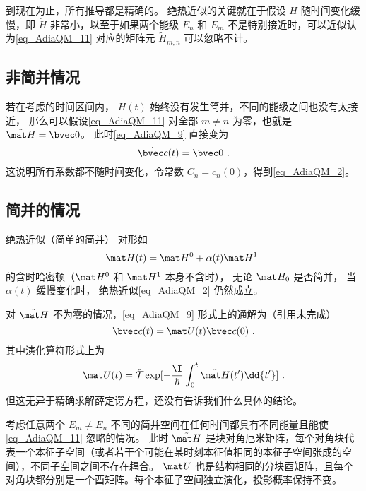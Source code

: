 到现在为止，所有推导都是精确的。 绝热近似的关键就在于假设 $H$ 随时间变化缓慢，即 $\dot H$ 非常小，以至于如果两个能级 $E_n$ 和 $E_m$ 不是特别接近时，可以近似认为\autoref{eq_AdiaQM_11} 对应的矩阵元 $\tilde H_{m,n}$ 可以忽略不计。

\subsection{非简并情况}
若在考虑的时间区间内， $H(t)$ 始终没有发生简并，不同的能级之间也没有太接近， 那么可以假设\autoref{eq_AdiaQM_11} 对全部 $m\ne n$ 为零，也就是 $\tilde{\mat H} = \bvec 0$。 此时\autoref{eq_AdiaQM_9} 直接变为
\begin{equation}
\dot{\bvec c}(t) = \bvec 0~.
\end{equation}
这说明所有系数都不随时间变化，令常数 $C_n = c_n(0)$，得到\autoref{eq_AdiaQM_2}。

\subsection{简并的情况}\label{sub_AdiaQM_1}
\begin{theorem}{绝热近似（简单的简并）}
对形如
\begin{equation}\label{eq_AdiaQM_15}
\mat H(t) = \mat H^0 + \alpha(t)\mat H^1~
\end{equation}
的含时哈密顿（$\mat H^0$ 和 $\mat H^1$ 本身不含时）， 无论 $\mat H_0$ 是否简并， 当 $\alpha(t)$ 缓慢变化时， 绝热近似\autoref{eq_AdiaQM_2} 仍然成立。
\end{theorem}

对 $\tilde{\mat H}$ 不为零的情况，\autoref{eq_AdiaQM_9} 形式上的通解为（引用未完成）
\begin{equation}
\bvec c(t) = \mat U(t)\bvec c(0)~.
\end{equation}
其中演化算符形式上为
\begin{equation}
\mat U(t) = \hat{\mathcal{T}}\exp[-\frac{\I}{\hbar}\int_0^t \tilde{\mat H}(t') \dd{t'}]~.
\end{equation}
但这无异于精确求解薛定谔方程，还没有告诉我们什么具体的结论。

考虑任意两个 $E_m\ne E_n$ 不同的简并空间在任何时间都具有不同能量且能使\autoref{eq_AdiaQM_11} 忽略的情况。 此时 $\tilde{\mat H}$ 是块对角厄米矩阵，每个对角块代表一个本征子空间（或者若干个可能在某时刻本征值相同的本征子空间张成的空间），不同子空间之间不存在耦合。 $\mat U$ 也是结构相同的分块酉矩阵，且每个对角块都分别是一个酉矩阵。每个本征子空间独立演化，投影概率保持不变。

